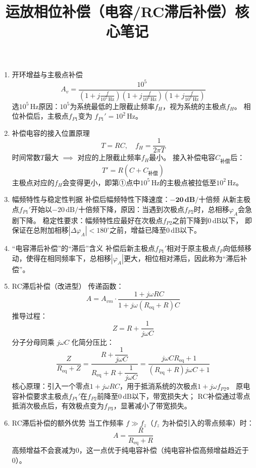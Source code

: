 \documentclass{article}
\begin{document}
\title{运放相位补偿（电容/RC滞后补偿）核心笔记}
\author{}
\date{}
\maketitle

\begin{enumerate}
    \item 开环增益与主极点补偿
    \[
    A_v = \frac{10^5}{\left(1+j\frac{f}{10^5\,\text{Hz}}\right)\left(1+j\frac{f}{10^6\,\text{Hz}}\right)\left(1+j\frac{f}{10^7\,\text{Hz}}\right)}
    \]
    选$10^5\,\text{Hz}$原因：$10^5$为系统最低的上限截止频率$f_H$，视为系统的主极点$f_H$。
    相位补偿后，主极点$f_{P1}$变为 $f_{P1}' = 10^2\,\text{Hz}$。

    \item 补偿电容的接入位置原理
    \[
    T = RC,\quad f_H = \frac{1}{2\pi T}
    \]
    时间常数$T$最大 $\implies$ 对应的上限截止频率$f_H$最小。
    接入补偿电容$C_{\text{补偿}}$后：
    \[
    T' = R(C+C_{\text{补偿}})
    \]
    主极点对应的$f_H$会变得更小，即第①点中$10^5\,\text{Hz}$的主极点被拉低至$10^2\,\text{Hz}$。

    \item 幅频特性与稳定性判据
    补偿后幅频特性下降速度：$\boldsymbol{-20\,\text{dB/十倍频}}$
    从新主极点$f_{P1}'$开始以$-20\,\text{dB/十倍频}$下降，原因：当遇到次极点$f_{P2}$时，总相移$\varphi_A$会急剧下降。
    稳定性要求：幅频特性应最好在次极点$f_{P2}$之前下降到$0\,\text{dB}$以下，
    即保证在总附加相移$|\Delta\varphi_A| < 180^\circ$之前，增益已降至$0\,\text{dB}$以下。

    \item “电容滞后补偿”的“滞后”含义
    补偿后新主极点$f_{P1}'$相对于原主极点$f_P$向低频移动，使得在相同频率下，总相移$|\varphi_A|$更大，相位相对滞后，因此称为“滞后补偿”。

    \item RC滞后补偿（改进型）
    传递函数：
    \[
    A = A_{vm} \cdot \frac{1+j\omega RC}{1+j\omega (R_{\text{eq}}+R)C}
    \]
    推导过程：
    \[
    Z = R + \frac{1}{j\omega C}
    \]
    分子分母同乘 $j\omega C$ 化简分压比：
    \[
    \frac{Z}{R_{\text{eq}}+Z} = \frac{R+\dfrac{1}{j\omega C}}{R_{\text{eq}}+R+\dfrac{1}{j\omega C}} = \frac{j\omega C R_{\text{eq}} + 1}{(R_{\text{eq}}+R)j\omega C + 1}
    \]
    核心原理：引入一个零点$1+j\omega RC$，用于抵消系统的次极点$1+j\omega f_{P2}$。
    原电容补偿要求主极点$f_{P1}'$在$f_{P2}$前降至$0\,\text{dB}$以下，带宽损失大；
    RC补偿通过零点抵消次极点后，有效极点变为$f_{P3}$，显著减小了带宽损失。

    \item RC滞后补偿的额外优势
    当工作频率 $f \gg f_z$（$f_z$ 为补偿引入的零点频率）时：
    \[
    A = \frac{R}{R_{\text{eq}}+R}
    \]
    高频增益不会衰减为0，这一点优于纯电容补偿（纯电容补偿高频增益趋近于0）。
\end{enumerate}
\end{document}
